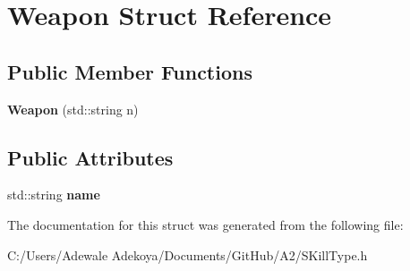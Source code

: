 \hypertarget{struct_weapon}{}\section{Weapon Struct Reference}
\label{struct_weapon}
\subsection*{Public Member Functions}
\begin{DoxyCompactItemize}
\item 
\hypertarget{struct_weapon_a3066227b3eb4195b1e28b7c2b0c660f6}{}{\bfseries Weapon} (std\+::string n)\label{struct_weapon_a3066227b3eb4195b1e28b7c2b0c660f6}

\end{DoxyCompactItemize}
\subsection*{Public Attributes}
\begin{DoxyCompactItemize}
\item 
\hypertarget{struct_weapon_a8bc12bf0ac8e3cdea9c8657ccb6217b5}{}std\+::string {\bfseries name}\label{struct_weapon_a8bc12bf0ac8e3cdea9c8657ccb6217b5}

\end{DoxyCompactItemize}


The documentation for this struct was generated from the following file\+:\begin{DoxyCompactItemize}
\item 
C\+:/\+Users/\+Adewale Adekoya/\+Documents/\+Git\+Hub/\+A2/S\+Kill\+Type.\+h\end{DoxyCompactItemize}
